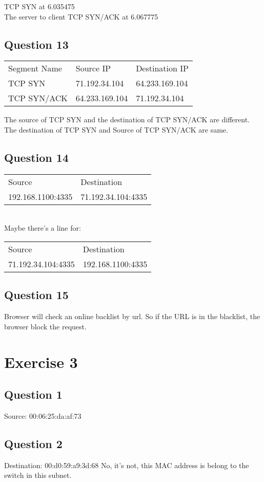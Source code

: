 \documentclass{article}
\begin{document}
TCP SYN at 6.035475 \\
The server to client TCP SYN/ACK at 6.067775

\subsection{Question 13}

\begin{tabular} {l l l}
    Segment Name& Source IP      & Destination IP\\
    TCP SYN     & 71.192.34.104  & 64.233.169.104\\
    TCP SYN/ACK & 64.233.169.104 & 71.192.34.104
\end{tabular}
The source of TCP SYN and the destination of TCP SYN/ACK are different.
The destination of TCP SYN and Source of TCP SYN/ACK are same.

\subsection{Question 14}
\begin{tabular} {l l}
    Source            & Destination\\
    192.168.1100:4335 & 71.192.34.104:4335
\end{tabular}\\
Maybe there's a line for:\\
\begin{tabular}{l l}
    Source            & Destination\\
    71.192.34.104:4335 & 192.168.1100:4335 
\end{tabular}

\subsection{Question 15}

Browser will check an online backlist by url. So if the URL is in the blacklist, the browser block the request.

\section{Exercise 3}

\subsection{Question 1}
Source: 00:06:25:da:af:73

\subsection{Question 2}
Destination: 00:d0:59:a9:3d:68
No, it's not, this MAC address is belong to the switch in this subnet.
\end{document}
